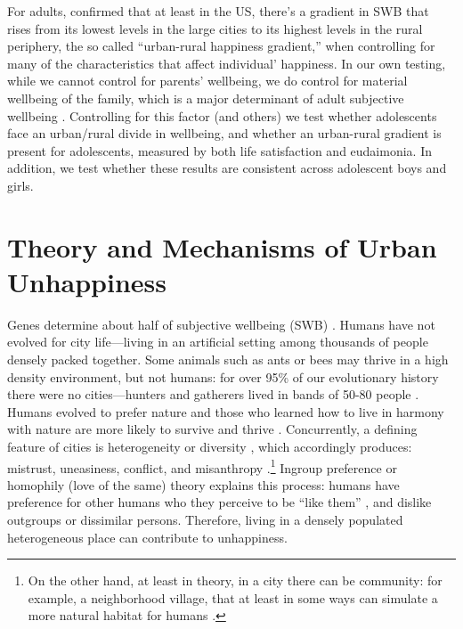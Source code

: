 \documentclass[11pt, letterpaper]{article}
\begin{document}
\begin{spacing}{1.9}
For adults,  \citet{aok11a} confirmed that at least in the
US, there's a gradient in SWB that rises from its lowest levels in the large
cities to its highest levels in the rural periphery, the so called ``urban-rural
happiness gradient,'' when controlling for many of the characteristics that
affect individual' happiness. In our own testing, while we cannot control for
parents' wellbeing, we do control for material wellbeing of the family, which is
a major determinant of adult subjective wellbeing \citep{clark2018}. Controlling for
this factor (and others) we test whether adolescents face an urban/rural divide
in wellbeing, and whether an urban-rural gradient is present for adolescents,
measured by both life satisfaction and eudaimonia. In addition, we test whether
these results are consistent across adolescent boys and girls.




\section*{Theory and Mechanisms of Urban Unhappiness}

 Genes determine about half of subjective wellbeing (SWB)
 \citep{schnittker08,lykken96t,brooksGenetic}.
 Humans have not
evolved for city life---living in an artificial setting among thousands of people densely packed together. Some animals such as ants or bees may thrive in a high density environment, but not humans: for over 95\% of our evolutionary history there were no cities---hunters and
gatherers lived in bands of 50-80 people \citep{maryanski92}. Humans evolved to
prefer nature and those who learned how to live in harmony with nature are more
likely to survive and thrive \citep{pretty12,yamamoto16}. 
Concurrently, a defining feature of cities is heterogeneity or diversity \citep{wirth38}, which accordingly produces: 
 mistrust, uneasiness, conflict, and misanthropy
 \citep{milgram70,thrift05,amin06,aok22}.\footnote{On the other hand, at least in theory, in a city there can be community: for example, a neighborhood village, that at least in some ways can simulate a more natural habitat for humans \citep{fischer95,fischer75,jacobs93}.}
Ingroup preference or homophily (love of the same) theory explains this process: humans have preference for other humans who they perceive to be ``like them'' \citep{mcpherson01,tajfel82,tajfel71,smelser99,putnam07,christakis09f}, and dislike outgroups or dissimilar persons. Therefore, living in a densely populated heterogeneous place can contribute to unhappiness.



\end{spacing}
\end{document}
